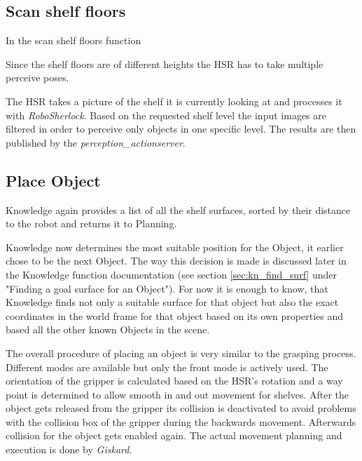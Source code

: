 \documentclass[main.tex]{subfiles}
\begin{document}
	\subsection{Scan shelf floors}
	
	In the scan shelf floors function
	
	Since the shelf floors are of different heights the HSR has to take multiple perceive poses.
	
	The HSR takes a picture of the shelf it is currently looking at and processes it with \textit{RoboSherlock}. Based on the requested shelf level the input images are filtered in order to perceive only objects in one specific level. The results are then published by the \textit{perception\_actionserver}.
	
	
	\subsection{Place Object}
	
	
	Knowledge again provides a list of all the shelf surfaces, sorted by their distance to the robot and returns it to Planning.
	
	
	Knowledge now determines the most suitable position for the Object, it earlier chose to be the next Object. The way this decision is made is discussed later in the Knowledge function documentation (see section \ref{sec:kn_find_surf} under "Finding a goal surface for an Object"). For now it is enough to know, that Knowledge finds not only a suitable surface for that object but also the exact coordinates in the world frame for that object based on its own properties and based all the other known Objects in the scene.
	
	The overall procedure of placing an object is very similar to the grasping process. Different modes are available but only the front mode is actively used. The orientation of the gripper is calculated based on the HSR's rotation and a way point is determined to allow smooth in and  out movement for shelves. After the object gets released from the gripper its collision is deactivated to avoid problems with the collision box of the gripper during the backwards movement. Afterwards collision for the object gets enabled again. The actual movement planning and execution is done by \textit{Giskard}.   	
	
\end{document}
